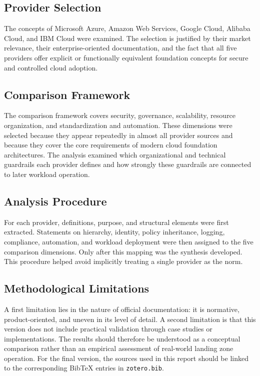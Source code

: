 \subsection{Provider Selection}

The concepts of Microsoft Azure, Amazon Web Services, Google Cloud, Alibaba Cloud, and IBM Cloud were examined. The selection is justified by their market relevance, their enterprise-oriented documentation, and the fact that all five providers offer explicit or functionally equivalent foundation concepts for secure and controlled cloud adoption.

\subsection{Comparison Framework}

The comparison framework covers security, governance, scalability, resource organization, and standardization and automation. These dimensions were selected because they appear repeatedly in almost all provider sources and because they cover the core requirements of modern cloud foundation architectures. The analysis examined which organizational and technical guardrails each provider defines and how strongly these guardrails are connected to later workload operation.

\subsection{Analysis Procedure}

For each provider, definitions, purpose, and structural elements were first extracted. Statements on hierarchy, identity, policy inheritance, logging, compliance, automation, and workload deployment were then assigned to the five comparison dimensions. Only after this mapping was the synthesis developed. This procedure helped avoid implicitly treating a single provider as the norm.

\subsection{Methodological Limitations}

A first limitation lies in the nature of official documentation: it is normative, product-oriented, and uneven in its level of detail. A second limitation is that this version does not include practical validation through case studies or implementations. The results should therefore be understood as a conceptual comparison rather than an empirical assessment of real-world landing zone operation. For the final version, the sources used in this report should be linked to the corresponding BibTeX entries in \texttt{zotero.bib}.


